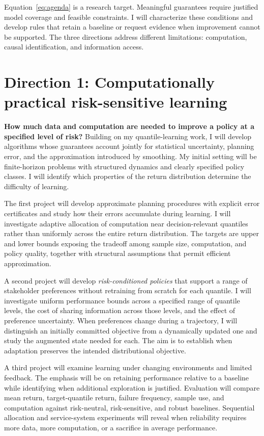 \documentclass[11pt,letterpaper]{article}
\begin{document}
Equation~\eqref{eq:agenda} is a research target. Meaningful guarantees
require justified model coverage and feasible constraints. I will
characterize these conditions and develop rules that retain a baseline
or request evidence when improvement cannot be supported. The three
directions address different limitations: computation, causal
identification, and information access.

\section{Direction 1: Computationally practical risk-sensitive learning}

\textbf{How much data and computation are needed to improve a policy at a
specified level of risk?} Building on my quantile-learning work, I will
develop algorithms whose guarantees account jointly for statistical
uncertainty, planning error, and the approximation introduced by
smoothing. My initial setting will be finite-horizon problems with
structured dynamics and clearly specified policy classes. I will identify
which properties of the return distribution determine the difficulty of
learning.

The first project will develop approximate planning procedures with
explicit error certificates and study how their errors accumulate during
learning. I will investigate adaptive allocation of computation near
decision-relevant quantiles rather than uniformly across the entire
return distribution. The targets are upper and lower bounds exposing the
tradeoff among sample size, computation, and policy quality, together with
structural assumptions that permit efficient approximation.

A second project will develop \emph{risk-conditioned policies} that support
a range of stakeholder preferences without retraining from scratch for
each quantile. I will investigate uniform performance bounds across a
specified range of quantile levels, the cost of sharing information
across those levels, and the effect of preference uncertainty. When
preferences change during a trajectory, I will distinguish an initially
committed objective from a dynamically updated one and study the augmented
state needed for each. The aim is to establish when adaptation preserves
the intended distributional objective.

A third project will examine learning under changing environments and
limited feedback. The emphasis will be on retaining performance relative
to a baseline while identifying when additional exploration is justified.
Evaluation will compare mean return, target-quantile return, failure
frequency, sample use, and computation against risk-neutral,
risk-sensitive, and robust baselines. Sequential allocation and
service-system experiments will reveal when reliability requires more
data, more computation, or a sacrifice in average performance.
\end{document}
